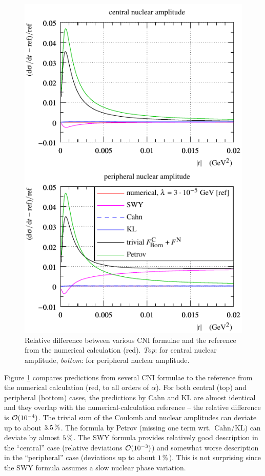 \documentclass{appolb}
\def\un#1{\,{\rm #1}}
\begin{document}
\begin{figure}[h]
\begin{center}
\includegraphics{fig/cni_dsdt_cmp_formula.pdf}
\caption{Relative difference between various CNI formulae and the reference from the numerical calculation (red). {\it Top}: for central nuclear amplitude, {\it bottom}: for peripheral nuclear amplitude.}
\label{f:sig form}
\end{center}
\end{figure}

Figure \ref{f:sig form} compares predictions from several CNI formulae to the reference from the numerical calculation (red, to all orders of $\alpha$). For both central (top) and peripheral (bottom) cases, the predictions by Cahn and KL are almost identical and they overlap with the numerical-calculation reference -- the relative difference is ${\cal O}(10^{-4})$. The trivial sum of the Coulomb and nuclear amplitudes can deviate up to about $3.5\un{\%}$. The formula by Petrov (missing one term wrt.~Cahn/KL) can deviate by almost $5\un{\%}$. The SWY formula provides relatively good description in the ``central'' case (relative deviations ${\cal O}(10^{-3})$) and somewhat worse description in the ``peripheral'' case (deviations up to about $1\un{\%}$). This is not surprising since the SWY formula assumes a slow nuclear phase variation.
\end{document}
